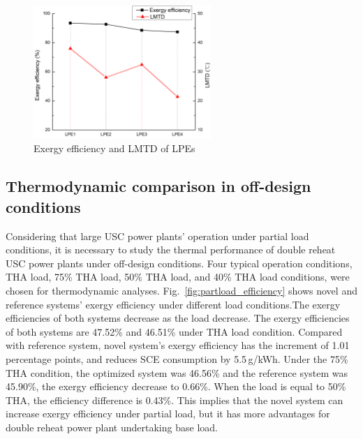\documentclass[preprint,12pt]{elsarticle}
\begin{document}
\begin{figure}[htbp]
\centering
\includegraphics[width=0.6\textwidth]{fig/LPE_exergy_LMTD.png}
\caption{Exergy efficiency and LMTD of LPEs} 
\label{fig:LPE_exergy_LMDT}
\end{figure}

\subsection{Thermodynamic comparison in off-design conditions}
\label{ssub:0ffdesing_compare}
Considering that large USC power plants' operation under partial load conditions, it is necessary to study the thermal performance of double reheat USC power plants under off-design conditions.
Four typical operation conditions, THA load, 75\% THA load, 50\% THA load, and 40\% THA load conditions, were chosen for thermodynamic analyses. 
Fig.~\ref{fig:partload_efficiency} shows novel and reference systems' exergy efficiency under different load conditions.The exergy efficiencies of both systems decrease as the load decrease.
The exergy efficiencies of both systems are 47.52\% and 46.51\% under THA load condition. Compared with reference system, novel system's exergy efficiency has the increment of 1.01 percentage points, and reduces SCE consumption by 5.5\,g/kWh.
Under the 75\% THA condition, the optimized system was 46.56\% and the reference system was 45.90\%, the exergy
efficiency decrease to 0.66\%. 
When the load is equal to 50\% THA, the efficiency difference is 0.43\%.
This implies that the novel system can increase exergy efficiency under partial load, but it has more advantages for double reheat power plant undertaking base load.
\end{document}
